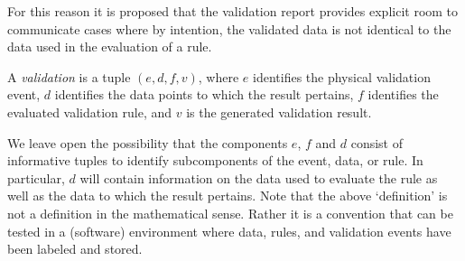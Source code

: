 For this reason it is proposed that the validation report provides explicit
room to communicate cases where by intention, the validated data is not
identical to the data used in the evaluation of a rule. 
%
\begin{definition}[validation] 
A \emph{validation} is a tuple $(e,d,f,v)$, where $e$ identifies the
physical validation event, $d$ identifies the data points to which the result
pertains, $f$ identifies the evaluated validation rule, and $v$ is the
generated validation result.
\label{def:confrontation}
\end{definition}
%
We leave open the possibility that the components $e$, $f$ and $d$ consist of
informative tuples to identify subcomponents of the event, data, or rule.  In
particular, $d$ will contain information on the data used to evaluate the rule
as well as the data to which the result pertains. Note that the above
`definition' is not a definition in the mathematical sense.  Rather it is a
convention that can be tested in a (software) environment where data, rules,
and validation events have been labeled and stored.






